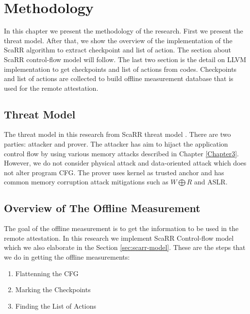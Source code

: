 
\chapter{Methodology} %

\label{Chapter4} %

In this chapter we present the methodology of the research. First we present the threat model. After that, we show the overview of the implementation of the ScaRR algorithm to extract checkpoint and list of action. The section about ScaRR control-flow model will follow. The last two section is the detail on LLVM implementation to get checkpoints and list of actions from codes. Checkpoints and list of actions are collected to build offline measurement database that is used for the remote attestation.

\section{Threat Model}

The threat model in this research from ScaRR threat model \cite{toffaliniScaRRScalableRuntime2019}. There are two parties: attacker and prover. The attacker has aim to hijact the application control flow by using various memory attacks described in Chapter \ref{Chapter3}. However, we do not consider physical attack and data-oriented attack which does not alter program CFG. The prover uses kernel as trusted anchor and has common memory corruption attack mitigations such as \( W \bigoplus R \) and ASLR. 

\section{Overview of The Offline Measurement}

The goal of the offline measurement is to get the information to be used in the remote attestation. In this research we implement ScaRR Control-flow model \cite{toffaliniScaRRScalableRuntime2019} which we also elaborate in the Section \ref{sec:scarr-model}. These are the steps that we do in getting the offline measurements:

\begin{enumerate}
    \item Flattenning the CFG
    \item Marking the Checkpoints
    \item Finding the List of Actions
\end{enumerate}

